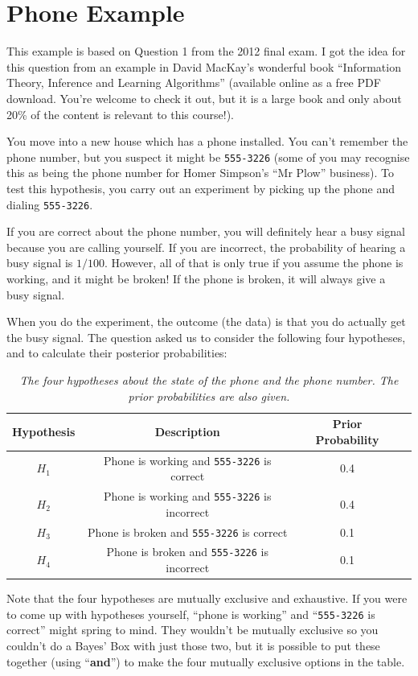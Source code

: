 \section{Phone Example}
This example is based on Question 1 from the 2012 final exam. I got the
idea for this question from an example in David MacKay's wonderful book
``Information Theory, Inference and Learning Algorithms''
(available online as a free PDF download. You're welcome to check it out, but
it is a large book and only about 20\% of the content is relevant to this course!).

You move into a new house which has a phone
installed. You can't remember the phone number, but you suspect it
might be {\tt 555-3226} (some of you may recognise
this as being the phone number for Homer Simpson's ``Mr Plow'' business).
To test this hypothesis, you carry out an experiment
by picking up the phone and dialing {\tt 555-3226}.

If you are correct about
the phone number, you will definitely hear a busy signal because you are calling
yourself.
If you are incorrect, the probability of hearing a busy signal is $1/100$.
However, all of that is only true if you assume the phone is working, and it
might be broken! If the phone is broken, it will always give a busy signal.

When you do the experiment, the outcome (the data) is that you do actually get the busy signal.
The question asked us to consider the following four hypotheses, and to calculate
their posterior probabilities:
\begin{table}[!ht]
\begin{center}
\begin{tabular}{|c|c|c|c|}
\hline
Hypothesis & Description & Prior Probability\\
\hline
$H_1$ & Phone is working and {\tt 555-3226} is correct & 0.4\\
$H_2$ & Phone is working and {\tt 555-3226} is incorrect & 0.4\\
$H_3$ & Phone is broken and {\tt 555-3226} is correct & 0.1\\
$H_4$ & Phone is broken and {\tt 555-3226} is incorrect & 0.1\\
\hline
\end{tabular}
\caption{\it The four hypotheses about the state of the phone and the phone
number. The prior probabilities are also given.
\label{tab:phone}}
\end{center}
\end{table}
Note that the four hypotheses are mutually exclusive and exhaustive. If you were
to come up with hypotheses yourself, ``phone is working'' and ``{\tt 555-3226} is correct''
might spring to mind. They wouldn't be mutually exclusive so you couldn't do a
Bayes' Box with just those two, but it is possible to put these together (using
``{\bf and}'') to make the four mutually exclusive options in the table.

